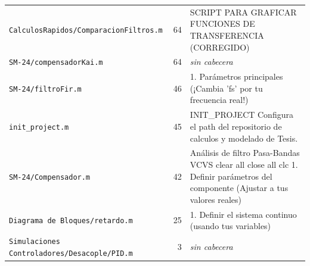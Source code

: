\begin{longtable}{@{}p{5.4cm} r p{8.6cm}@{}}
\texttt{\scriptsize CalculosRapidos/ComparacionFiltros.m} & 64 & SCRIPT PARA GRAFICAR FUNCIONES DE TRANSFERENCIA (CORREGIDO) \\
\texttt{\scriptsize SM-24/compensadorKai.m} & 64 & \textit{sin cabecera} \\
\texttt{\scriptsize SM-24/filtroFir.m} & 46 & 1. Parámetros principales (¡Cambia 'fs' por tu frecuencia real!) \\
\texttt{\scriptsize init\_project.m} & 45 & INIT\_PROJECT Configura el path del repositorio de calculos y modelado de Tesis. \\
\texttt{\scriptsize SM-24/Compensador.m} & 42 & Análisis de filtro Pasa-Bandas VCVS clear all close all clc 1. Definir parámetros del componente (Ajustar a tus valores reales) \\
\texttt{\scriptsize Diagrama de Bloques/retardo.m} & 25 & 1. Definir el sistema continuo (usando tus variables) \\
\texttt{\scriptsize Simulaciones Controladores/Desacople/PID.m} & 3 & \textit{sin cabecera} \\
\end{longtable}
\normalsize


